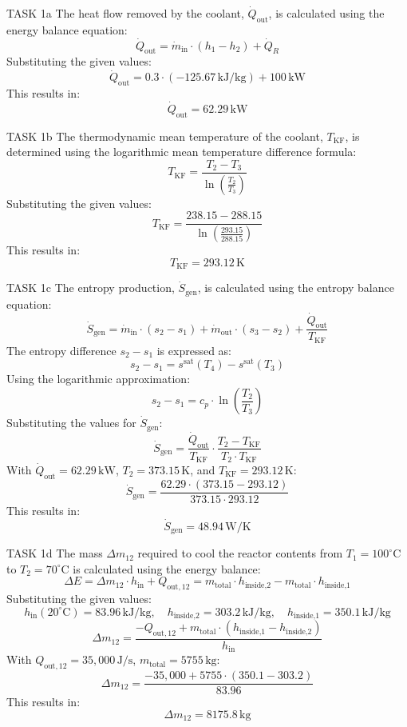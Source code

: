 TASK 1a  
The heat flow removed by the coolant, \( \dot{Q}_{\text{out}} \), is calculated using the energy balance equation:  
\[
\dot{Q}_{\text{out}} = \dot{m}_{\text{in}} \cdot (h_1 - h_2) + \dot{Q}_R
\]  
Substituting the given values:  
\[
\dot{Q}_{\text{out}} = 0.3 \cdot (-125.67 \, \text{kJ/kg}) + 100 \, \text{kW}
\]  
This results in:  
\[
\dot{Q}_{\text{out}} = 62.29 \, \text{kW}
\]  

TASK 1b  
The thermodynamic mean temperature of the coolant, \( T_{\text{KF}} \), is determined using the logarithmic mean temperature difference formula:  
\[
T_{\text{KF}} = \frac{T_2 - T_3}{\ln \left( \frac{T_2}{T_3} \right)}
\]  
Substituting the given values:  
\[
T_{\text{KF}} = \frac{238.15 - 288.15}{\ln \left( \frac{293.15}{288.15} \right)}
\]  
This results in:  
\[
T_{\text{KF}} = 293.12 \, \text{K}
\]  

TASK 1c  
The entropy production, \( \dot{S}_{\text{gen}} \), is calculated using the entropy balance equation:  
\[
\dot{S}_{\text{gen}} = \dot{m}_{\text{in}} \cdot (s_2 - s_1) + \dot{m}_{\text{out}} \cdot (s_3 - s_2) + \frac{\dot{Q}_{\text{out}}}{T_{\text{KF}}}
\]  
The entropy difference \( s_2 - s_1 \) is expressed as:  
\[
s_2 - s_1 = s^{\text{sat}}(T_4) - s^{\text{sat}}(T_3)
\]  
Using the logarithmic approximation:  
\[
s_2 - s_1 = c_p \cdot \ln \left( \frac{T_2}{T_3} \right)
\]  
Substituting the values for \( \dot{S}_{\text{gen}} \):  
\[
\dot{S}_{\text{gen}} = \frac{\dot{Q}_{\text{out}}}{T_{\text{KF}}} \cdot \frac{T_2 - T_{\text{KF}}}{T_2 \cdot T_{\text{KF}}}
\]  
With \( \dot{Q}_{\text{out}} = 62.29 \, \text{kW} \), \( T_2 = 373.15 \, \text{K} \), and \( T_{\text{KF}} = 293.12 \, \text{K} \):  
\[
\dot{S}_{\text{gen}} = \frac{62.29 \cdot (373.15 - 293.12)}{373.15 \cdot 293.12}
\]  
This results in:  
\[
\dot{S}_{\text{gen}} = 48.94 \, \text{W/K}
\]  

TASK 1d  
The mass \( \Delta m_{12} \) required to cool the reactor contents from \( T_1 = 100^\circ\text{C} \) to \( T_2 = 70^\circ\text{C} \) is calculated using the energy balance:  
\[
\Delta E = \Delta m_{12} \cdot h_{\text{in}} + Q_{\text{out},12} = m_{\text{total}} \cdot h_{\text{inside,2}} - m_{\text{total}} \cdot h_{\text{inside,1}}
\]  
Substituting the given values:  
\[
h_{\text{in}}(20^\circ\text{C}) = 83.96 \, \text{kJ/kg}, \quad h_{\text{inside,2}} = 303.2 \, \text{kJ/kg}, \quad h_{\text{inside,1}} = 350.1 \, \text{kJ/kg}
\]  
\[
\Delta m_{12} = \frac{-Q_{\text{out},12} + m_{\text{total}} \cdot (h_{\text{inside,1}} - h_{\text{inside,2}})}{h_{\text{in}}}
\]  
With \( Q_{\text{out},12} = 35,000 \, \text{J/s} \), \( m_{\text{total}} = 5755 \, \text{kg} \):  
\[
\Delta m_{12} = \frac{-35,000 + 5755 \cdot (350.1 - 303.2)}{83.96}
\]  
This results in:  
\[
\Delta m_{12} = 8175.8 \, \text{kg}
\]  